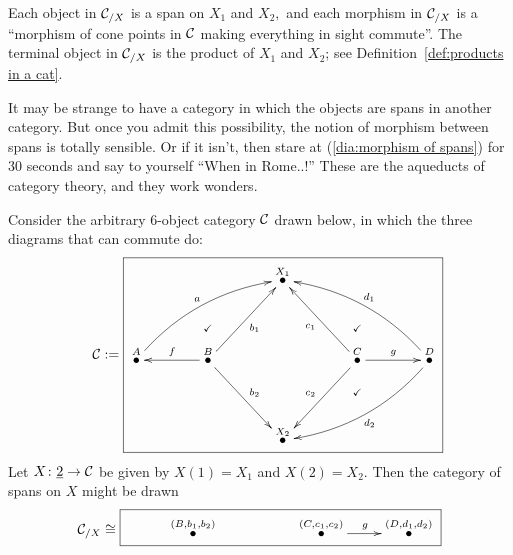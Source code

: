 \documentclass[CT4S-EN-RU]{subfiles}
\begin{document}
\begin{constructionENG}[Products]
Each object in $\mathcal{C}_{/X}$ is a span on $X_1$ and $X_2,$ and each morphism in $\mathcal{C}_{/X}$ is a “morphism of cone points in $\mathcal{C}$ making everything in sight commute”. The terminal object in $\mathcal{C}_{/X}$ is the product of $X_1$ and $X_2$; see Definition~\ref{def:products in a cat}.
\end{constructionENG}

\begin{constructionRUS}[Products]
\end{constructionRUS}

\begin{blockENG}
It may be strange to have a category in which the objects are spans in another category. But once you admit this possibility, the notion of morphism between spans is totally sensible. Or if it isn't, then stare at (\ref{dia:morphism of spans}) for 30 seconds and say to yourself “When in Rome..!” These are the aqueducts of category theory, and they work wonders.
\end{blockENG}

\begin{blockRUS}
\end{blockRUS}

\begin{exampleENG}\label{ex:category of spans}
Consider the arbitrary 6-object category $\mathcal{C}$ drawn below, in which the three diagrams that can commute do:
$$\mcC:=\parbox{3in}{\fbox{\xymatrix@=39pt{&&\LMO{X_1}&\\\LMO{A}\ar@/^1pc/[urr]^a&\LMO{B}\ar[l]_f\ar@{}[u]|(.4){\checkmark}\ar[ur]_{b_1}\ar[dr]^{b_2}&&\LMO{C}\ar@{}[u]|(.4){\checkmark}\ar@{}[d]|(.4){\checkmark}\ar[ul]^{c_1}\ar[dl]_{c_2}\ar[r]^g&\LMO{D}\ar@/_1pc/[llu]_{d_1}\ar@/^1pc/[lld]^{d_2}\\&&\LMO{X_2}&}}}$$
Let $X\colon\underline{2}\rightarrow\mathcal{C}$ be given by $X(1)=X_1$ and $X(2)=X_2.$ Then the category of spans on $X$ might be drawn
$$\mcC_{/X}\iso\fbox{\xymatrix{&\LMO{(B,b_1,b_2)}&&\LMO{(C,c_1,c_2)}\ar[r]^g&\LMO{(D,d_1,d_2)}}}$$
\end{exampleENG}

\begin{exampleRUS}\label{ex:category of spans}
\end{exampleRUS}


\subsubsection{}
\end{document}
